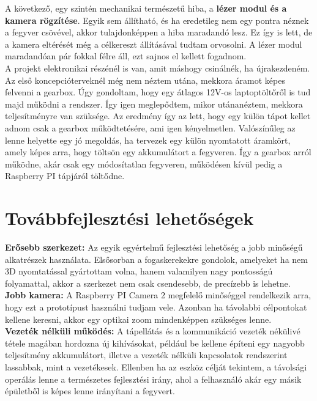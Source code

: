 \documentclass[12pt,a4paper]{article}
\begin{document}
A következő, egy szintén mechanikai természetű hiba, a \textbf{lézer modul és a kamera rögzítése}. Egyik sem állítható, és ha eredetileg nem egy pontra néznek a fegyver csövével, akkor tulajdonképpen a hiba maradandó lesz. Ez így is lett, de a kamera eltérését még a célkereszt állításával tudtam orvosolni. A lézer modul maradandóan pár fokkal félre áll, ezt sajnos el kellett fogadnom.\\

A projekt elektronikai részénél is van, amit máshogy csinálnék, ha újrakezdeném. Az első koncepcióterveknél még nem néztem utána, mekkora áramot képes felvenni a gearbox. Úgy gondoltam, hogy egy átlagos 12V-os laptoptöltőről is tud majd működni a rendszer. Így igen meglepődtem, mikor utánanéztem, mekkora teljesítményre van szüksége. Az eredmény így az lett, hogy egy külön tápot kellet adnom csak a gearbox működtetésére, ami igen kényelmetlen. Valószínűleg az lenne helyette egy jó megoldás, ha tervezek egy külön nyomtatott áramkört, amely képes arra, hogy töltsön egy akkumulátort a fegyveren. Így a gearbox arról működne, akár csak egy módosítatlan fegyveren, működésen kívül pedig a Raspberry PI tápjáról töltődne. 

\pagebreak
\section{Továbbfejlesztési lehetőségek}
\textbf{Erősebb szerkezet:} Az egyik egyértelmű fejlesztési lehetőség a jobb minőségű alkatrészek használata. Elsősorban a fogaskerekekre gondolok, amelyeket ha nem 3D nyomtatással gyártottam volna, hanem valamilyen nagy pontosságú folyamattal, akkor a szerkezet nem csak csendesebb, de precízebb is lehetne.\\

\textbf{Jobb kamera:} A Raspberry PI Camera 2 megfelelő minőséggel rendelkezik arra, hogy ezt a prototípust használni tudjam vele. Azonban ha távolabbi célpontokat kellene keresni, akkor egy optikai zoom mindenképpen szükséges lenne.\\

\textbf{Vezeték nélküli működés:} A tápellátás és a kommunikáció vezeték nékülivé tétele magában hordozna új kihívásokat, például be kellene építeni egy nagyobb teljesítmény akkumulátort, illetve a vezeték nélküli kapcsolatok rendszerint lassabbak, mint a vezetékesek. Ellenben ha az eszköz célját tekintem, a távolsági operálás lenne a természetes fejlesztési irány, ahol a felhasználó akár egy másik épületből is képes lenne irányítani a fegyvert.\\
\end{document}
